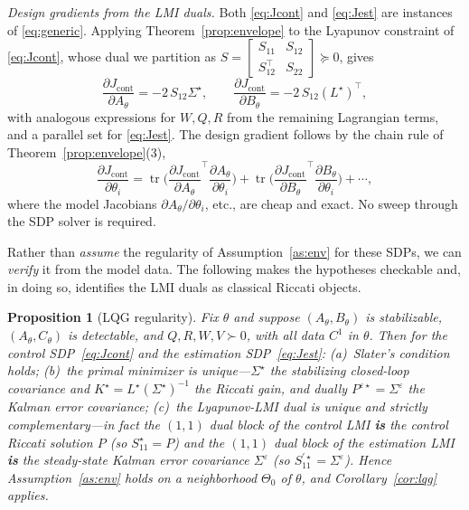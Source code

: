 \documentclass[twocolumn,amsthm]{autart}
\newtheorem{proposition}{Proposition}
\begin{document}
\emph{Design gradients from the LMI duals.} Both \eqref{eq:Jcont} and
\eqref{eq:Jest} are instances of \eqref{eq:generic}. Applying
Theorem~\ref{prop:envelope} to the Lyapunov constraint of \eqref{eq:Jcont},
whose dual we partition as
$S = \left[\begin{smallmatrix} S_{11} & S_{12} \\ S_{12}^\top & S_{22}
\end{smallmatrix}\right] \succeq 0$, gives
\begin{equation}\label{eq:gradAB}
\frac{\partial J_{\mathrm{cont}}}{\partial A_\theta} = -2\, S_{12}\Sigma^\star,
\qquad
\frac{\partial J_{\mathrm{cont}}}{\partial B_\theta} = -2\, S_{12}(L^\star)^\top,
\end{equation}
with analogous expressions for $W, Q, R$ from the remaining Lagrangian terms, and
a parallel set for \eqref{eq:Jest}. The design gradient follows by the chain rule
of Theorem~\ref{prop:envelope}(3),
\begin{equation}\label{eq:chain}
\frac{\partial J_{\mathrm{cont}}}{\partial \theta_i} =
\operatorname{tr}\!\Big(\frac{\partial J_{\mathrm{cont}}}{\partial A_\theta}^{\!\top}
\frac{\partial A_\theta}{\partial \theta_i}\Big)
+ \operatorname{tr}\!\Big(\frac{\partial J_{\mathrm{cont}}}{\partial B_\theta}^{\!\top}
\frac{\partial B_\theta}{\partial \theta_i}\Big) + \cdots,
\end{equation}
where the model Jacobians $\partial A_\theta/\partial\theta_i$, etc., are cheap
and exact. No sweep through the SDP solver is required.

Rather than \emph{assume} the regularity of Assumption~\ref{as:env} for these
SDPs, we can \emph{verify} it from the model data. The following makes the
hypotheses checkable and, in doing so, identifies the LMI duals as classical
Riccati objects.

\begin{proposition}[LQG regularity]\label{prop:lqgreg}
Fix $\theta$ and suppose $(A_\theta,B_\theta)$ is stabilizable, $(A_\theta,
C_\theta)$ is detectable, and $Q,R,W,V\succ0$, with all data $C^1$ in $\theta$.
Then for the control SDP~\eqref{eq:Jcont} and the estimation
SDP~\eqref{eq:Jest}: \emph{(a)}~Slater's condition holds; \emph{(b)}~the primal
minimizer is unique---$\Sigma^\star$ the stabilizing closed-loop covariance and
$K^\star=L^\star(\Sigma^\star)^{-1}$ the Riccati gain, and dually
$P^{\varepsilon\star}=\Sigma^\varepsilon$ the Kalman error covariance;
\emph{(c)}~the Lyapunov-LMI dual is unique and strictly complementary---in fact
the $(1,1)$ dual block of the control LMI \textbf{is} the control Riccati
solution $P$ (so $S_{11}^\star=P$) and the $(1,1)$ dual block of the estimation
LMI \textbf{is} the steady-state Kalman error covariance $\Sigma^\varepsilon$ (so
$S_{11}^{\prime\star}=\Sigma^\varepsilon$). Hence Assumption~\ref{as:env} holds
on a neighborhood $\Theta_0$ of $\theta$, and Corollary~\ref{cor:lqg} applies.
\end{proposition}
\end{document}
